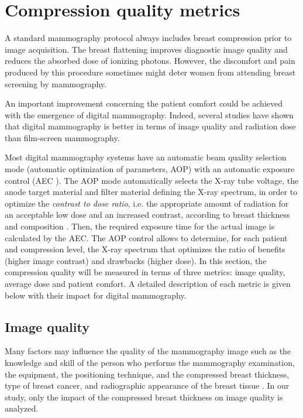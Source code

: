 \section{Compression quality metrics}
A standard mammography protocol always includes breast compression prior to image acquisition. The breast flattening improves diagnostic image quality and reduces the absorbed dose of ionizing photons. However, the discomfort and pain produced by this procedure sometimes might deter women from attending breast screening by mammography. 

An important improvement concerning the patient comfort could be achieved with the emergence of digital mammography. Indeed, several studies have shown that digital mammography is better in terms of image quality \citep{obenauer_screen_2002} and radiation dose \citep{chen_analysis_2012} than film-screen mammography.

Most digital mammography systems have an automatic beam quality selection mode (automatic optimization of parameters, AOP) with an automatic exposure control (AEC ). The AOP mode automatically selects the X-ray  tube  voltage, the anode  target  material  and  filter  material defining the X-ray spectrum, in order to optimize the \textit{contrast to dose ratio}, i.e. the appropriate amount of radiation for an acceptable low dose and an increased contrast, according to breast thickness and composition \citep{williams_optimization_2008}. Then, the required exposure time for the actual image is calculated by the AEC.  The AOP control allows to determine, for each patient and compression level, the X-ray spectrum that optimizes the  ratio of benefits  (higher image contrast) and  drawbacks  (higher  dose). 
In this section, the compression quality will be measured in terms of three metrics: image quality, average dose and patient comfort. A detailed description of each metric is given below with their impact for digital mammography. 

\subsection{Image quality}

Many factors may influence the quality of the mammography image such as the knowledge and skill of the person who performs the mammography examination, the equipment, the positioning
technique, and the compressed breast thickness, type of breast
cancer, and radiographic appearance of the breast tissue \citep{de_pain_2015,andolina2011mammographic}. In our study, only the impact of the compressed breast thickness on image quality is analyzed.

